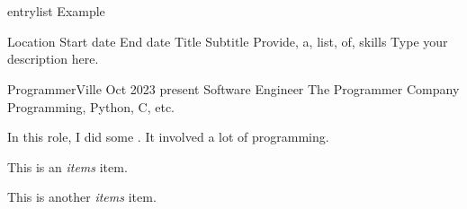 \section{\faCode}{entrylist Example}
\begin{entrylist}
	\entry
	{Location}
	{Start date}
	{End date} %
	{Title}
	{Subtitle}
	{Provide, a, list, of, skills} %
	{Type your description here.}
 
	\entry
	{ProgrammerVille}
	{Oct 2023}
	{present} %
	{Software Engineer }
	{The Programmer Company}
	{Programming, Python, C, etc.} %
	{In this role, I did some . It involved a lot of programming.
		\begin{items}
			\item This is an \emph{items} item.
			\item This is another \emph{items} item.
		\end{items}
	}
\end{entrylist}
